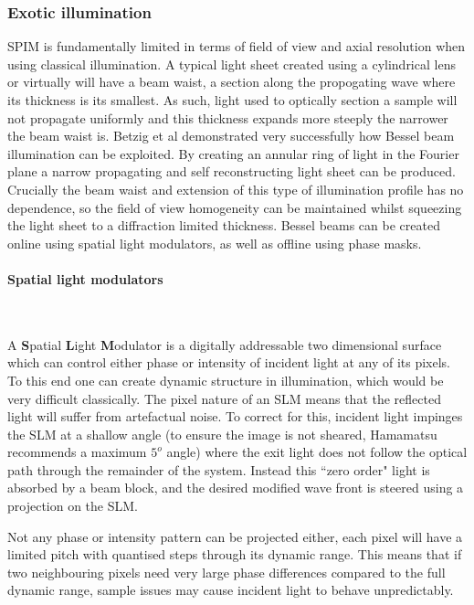\subsubsection{Exotic illumination}

SPIM is fundamentally limited in terms of field of view and axial resolution when using classical illumination.
A typical light sheet created using a cylindrical lens or virtually will have a beam waist, a section along the propogating wave where its thickness is its smallest.
As such, light used to optically section a sample will not propagate uniformly and this thickness expands more steeply the narrower the beam waist is\cite{Silfvast2004}.
Betzig et al demonstrated very successfully how Bessel beam illumination can be exploited.
By creating an annular ring of light in the Fourier plane a narrow propagating and self reconstructing light sheet can be produced\cite{Chen2014}.
Crucially the beam waist and extension of this type of illumination profile has no dependence, so the field of view homogeneity can be maintained whilst squeezing the light sheet to a diffraction limited thickness.
Bessel beams can be created online using spatial light modulators, as well as offline using phase masks.

\paragraph{Spatial light modulators}~

A \textbf{S}patial \textbf{L}ight \textbf{M}odulator is a digitally addressable two dimensional surface which can control either phase or intensity of incident light at any of its pixels.
To this end one can create dynamic structure in illumination, which would be very difficult classically. %
The pixel nature of an SLM means that the reflected light will suffer from artefactual noise.
To correct for this, incident light impinges the SLM at a shallow angle (to ensure the image is not sheared, Hamamatsu recommends a maximum \(5^o\) angle)  where the exit light does not follow the optical path through the remainder of the system.
Instead this ``zero order" light is absorbed by a beam block, and the desired modified wave front is steered using a projection on the SLM.

Not any phase or intensity pattern can be projected either, each pixel will have a limited pitch with quantised steps through its dynamic range.
This means that if two neighbouring pixels need very large phase differences compared to the full dynamic range, sample issues may cause incident light to behave unpredictably.

